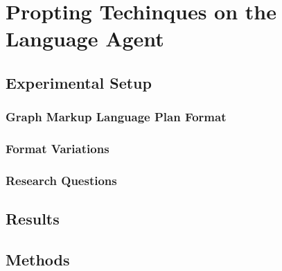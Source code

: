 

\chapter{Propting Techinques on the Language Agent}\label{chapter:prompting_techniques}

\section{Experimental Setup}

\subsection{Graph Markup Language Plan Format}

\subsection{Format Variations}

\subsection{Research Questions}

\section{Results}

\section{Methods}



